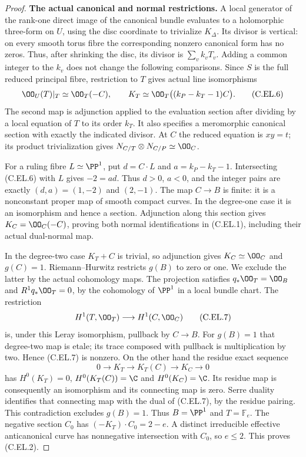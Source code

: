 \begin{proof}
\par\medskip\noindent\textbf{The actual canonical and normal restrictions.}
A local generator of the rank-one direct image of the canonical
bundle evaluates to a holomorphic three-form on $U$, using the
disc coordinate to trivialize $K_\Delta$. Its divisor is vertical:
on every smooth torus fibre the corresponding nonzero canonical
form has no zeros. Thus, after shrinking the disc, its divisor
is $\sum_v k_vT_v$. Adding a common integer to the $k_v$ does not
change the following comparisons. Since $S$ is the full reduced
principal fibre, restriction to $T$ gives actual line isomorphisms
\[
 \OO_U(T)|_T\simeq\OO_T(-C),\qquad
 K_T\simeq\OO_T\bigl((k_P-k_T-1)C\bigr).
                                                        \tag{C.EL.6}
\]
The second map is adjunction applied to the evaluation section
after dividing by a local equation of $T$ to its order $k_T$.
It also specifies a meromorphic canonical section with exactly
the indicated divisor. At $C$ the reduced equation is $xy=t$;
its product trivialization gives
$N_{C/T}\otimes N_{C/P}\simeq\OO_C$.

For a ruling fibre $L\simeq\PP^1$, put $d=C\cdot L$ and
$a=k_P-k_T-1$. Intersecting (C.EL.6) with $L$ gives
$-2=ad$. Thus $d>0$, $a<0$, and the integer pairs are exactly
$(d,a)=(1,-2)$ and $(2,-1)$. The map $C\to B$ is finite:
it is a nonconstant proper map of smooth compact curves. In the
degree-one case it is an isomorphism and hence a section.
Adjunction along this section gives
$K_C=\OO_C(-C)$, proving both normal identifications in
(C.EL.1), including their actual dual-normal map.

In the degree-two case $K_T+C$ is trivial, so adjunction gives
$K_C\simeq\OO_C$ and $g(C)=1$. Riemann--Hurwitz restricts
$g(B)$ to zero or one. We exclude the latter by the actual
cohomology maps. The projection satisfies
$q_*\OO_T=\OO_B$ and $R^1q_*\OO_T=0$, by the cohomology of
$\PP^1$ in a local bundle chart. The restriction
\[
 H^1(T,\OO_T)\longrightarrow H^1(C,\OO_C)
                                                        \tag{C.EL.7}
\]
is, under this Leray isomorphism, pullback by $C\to B$.
For $g(B)=1$ that degree-two map is etale; its trace composed
with pullback is multiplication by two. Hence (C.EL.7) is
nonzero. On the other hand the residue exact sequence
\[
 0\longrightarrow K_T\longrightarrow K_T(C)
       \longrightarrow K_C\longrightarrow0
                                                        \tag{C.EL.8}
\]
has $H^0(K_T)=0$, $H^0(K_T(C))=\C$ and $H^0(K_C)=\C$.
Its residue map is consequently an isomorphism and its
connecting map is zero. Serre duality identifies that connecting
map with the dual of (C.EL.7), by the residue pairing. This
contradiction excludes $g(B)=1$. Thus $B=\PP^1$ and
$T=\mathbb F_e$. The negative section $C_0$ has
$(-K_T)\cdot C_0=2-e$. A distinct irreducible effective
anticanonical curve has nonnegative intersection with $C_0$,
so $e\le2$. This proves (C.EL.2).


\end{proof}
